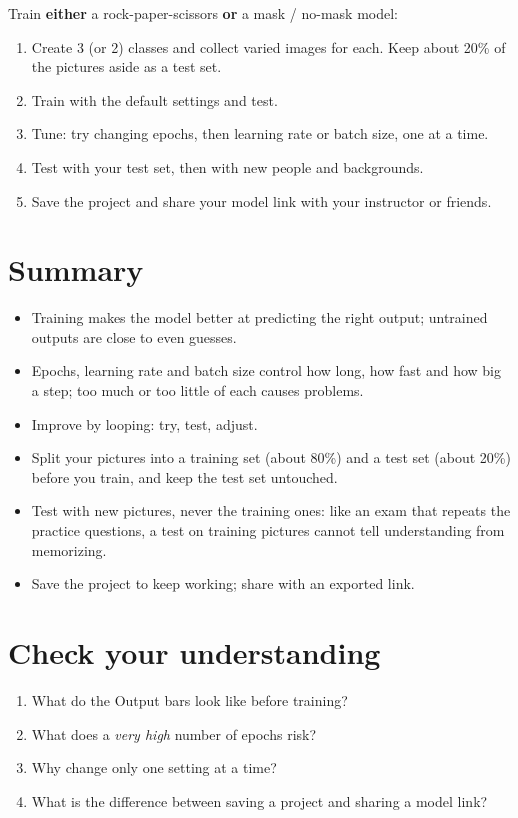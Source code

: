 Train \textbf{either} a rock-paper-scissors \textbf{or} a mask / no-mask model:


\begin{enumerate}
\item Create 3 (or 2) classes and collect varied images for each. Keep about 20\% of the pictures aside as a test set.
\item Train with the default settings and test.
\item Tune: try changing epochs, then learning rate or batch size, one at a time.
\item Test with your test set, then with new people and backgrounds.
\item Save the project and share your model link with your instructor or friends.
\end{enumerate}

\section*{Summary}

\begin{itemize}
\item Training makes the model better at predicting the right output; untrained outputs are close to even guesses.
\item Epochs, learning rate and batch size control how long, how fast and how big a step; too much or too little of each causes problems.
\item Improve by looping: try, test, adjust.
\item Split your pictures into a training set (about 80\%) and a test set (about 20\%) before you train, and keep the test set untouched.
\item Test with new pictures, never the training ones: like an exam that repeats the practice questions, a test on training pictures cannot tell understanding from memorizing.
\item Save the project to keep working; share with an exported link.
\end{itemize}

\section*{Check your understanding}

\begin{enumerate}
\item What do the Output bars look like before training?
\item What does a \emph{very high} number of epochs risk?
\item Why change only one setting at a time?
\item What is the difference between saving a project and sharing a model link?
\end{enumerate}

